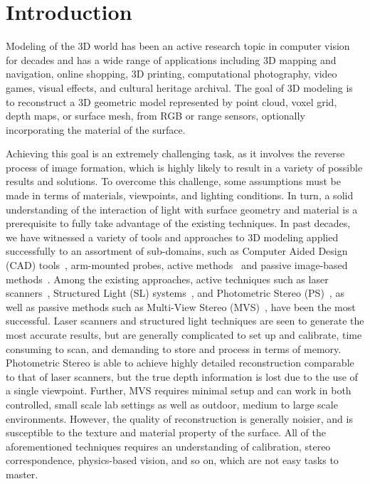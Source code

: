 
\chapter{Introduction}
\label{ch:Introduction}
Modeling of the 3D world has been an active research topic in computer vision for decades and has a wide range of applications including 3D mapping and navigation, online shopping, 3D printing, computational photography, video games, visual effects, and cultural heritage archival. The goal of 3D modeling is to reconstruct a 3D geometric model represented by point cloud, voxel grid, depth maps, or surface mesh, from RGB or range sensors, optionally incorporating the material of the surface.

Achieving this goal is an extremely challenging task, as it involves the reverse process of image formation, which is highly likely to result in a variety of possible results and solutions. To overcome this challenge, some assumptions must be made in terms of materials, viewpoints, and lighting conditions. In turn, a solid understanding of the interaction of light with surface geometry and material is a prerequisite to fully take advantage of the existing techniques. In past decades, we have witnessed a variety of tools and approaches to 3D modeling applied successfully to an assortment of sub-domains, such as Computer Aided Design (CAD) tools~\cite{CAD}, arm-mounted probes, active methods~\cite{bernardini2002building,levoy2000digital,Lidar,kinect} and passive image-based methods~\cite{kutulakos2000theory,furukawa2010accurate,faugeras2002variational,goesele2006multi}. Among the existing approaches, active techniques such as laser scanners~\cite{levoy2000digital}, Structured Light (SL) systems~\cite{bernardini2002building}, and Photometric Stereo (PS)~\cite{woodham1980photometric}, as well as passive methods such as Multi-View Stereo (MVS)~\cite{seitz2006comparison}, have been the most successful. Laser scanners and structured light techniques are seen to generate the most accurate results, but are generally complicated to set up and calibrate, time consuming to scan, and demanding to store and process in terms of memory. Photometric Stereo is able to achieve highly detailed reconstruction comparable to that of laser scanners, but the true depth information is lost due to the use of a single viewpoint. Further, MVS requires minimal setup and can work in both controlled, small scale lab settings as well as outdoor, medium to large scale environments. However, the quality of reconstruction is generally noisier, and is susceptible to the texture and material property of the surface. All of the aforementioned techniques requires an understanding of calibration, stereo correspondence, physics-based vision, and so on, which are not easy tasks to master.

